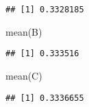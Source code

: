 \documentclass[
]{article}
\newenvironment{Shaded}{\begin{snugshade}}{\end{snugshade}}
\newcommand{\FunctionTok}[1]{\textcolor[rgb]{0.00,0.00,0.00}{#1}}
\newcommand{\NormalTok}[1]{#1}
\begin{document}
\begin{verbatim}
## [1] 0.3328185
\end{verbatim}

\begin{Shaded}
\begin{Highlighting}[]
\FunctionTok{mean}\NormalTok{(B)}
\end{Highlighting}
\end{Shaded}

\begin{verbatim}
## [1] 0.333516
\end{verbatim}

\begin{Shaded}
\begin{Highlighting}[]
\FunctionTok{mean}\NormalTok{(C)}
\end{Highlighting}
\end{Shaded}

\begin{verbatim}
## [1] 0.3336655
\end{verbatim}
\end{document}
